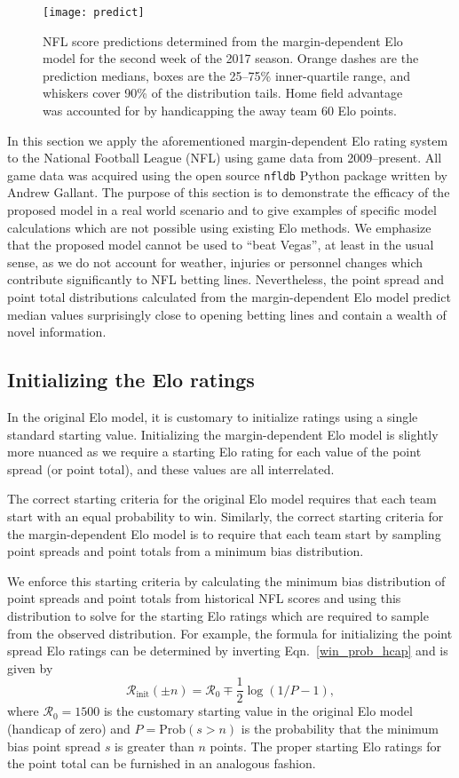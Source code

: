\documentclass[aps,prc,reprint,amsmath,superscriptaddress]{revtex4-1}
\begin{document}
\begin{figure}
  \texttt{[image: predict]}
  \caption{NFL score predictions determined from the margin-dependent Elo model for the second week of the 2017 season. Orange dashes are the prediction medians, boxes are the 25--75\% inner-quartile range, and whiskers cover 90\% of the distribution tails. Home field advantage was accounted for by handicapping the away team 60 Elo points.}
\end{figure}

In this section we apply the aforementioned margin-dependent Elo rating system to the National Football League (NFL) using game data from 2009--present.
All game data was acquired using the open source \texttt{nfldb} Python package written by Andrew Gallant.
The purpose of this section is to demonstrate the efficacy of the proposed model in a real world scenario and to give examples of specific model calculations which are not possible using existing Elo methods.
We emphasize that the proposed model cannot be used to ``beat Vegas'', at least in the usual sense, as we do not account for weather, injuries or personnel changes which contribute significantly to NFL betting lines.
Nevertheless, the point spread and point total distributions calculated from the margin-dependent Elo model predict median values surprisingly close to opening betting lines and contain a wealth of novel information.

\subsection{Initializing the Elo ratings}

In the original Elo model, it is customary to initialize ratings using a single standard starting value. 
Initializing the margin-dependent Elo model is slightly more nuanced as we require a starting Elo rating for each value of the point spread (or point total), and these values are all interrelated.

The correct starting criteria for the original Elo model requires that each team start with an equal probability to win.
Similarly, the correct starting criteria for the margin-dependent Elo model is to require that each team start by sampling point spreads and point totals from a minimum bias distribution.

We enforce this starting criteria by calculating the minimum bias distribution of point spreads and point totals from historical NFL scores and using this distribution to solve for the starting Elo ratings which are required to sample from the observed distribution.
For example, the formula for initializing the point spread Elo ratings can be determined by inverting Eqn.~\eqref{win_prob_hcap} and is given by
\begin{equation}
  \mathcal{R}_\text{init}(\pm n) = \mathcal{R}_0 \mp \frac{1}{2} \log\left(1/P - 1 \right),
\end{equation}
where $\mathcal{R}_0 = 1500$ is the customary starting value in the original Elo model (handicap of zero) and ${P=\mathrm{Prob}(s > n)}$ is the probability that the minimum bias point spread $s$ is greater than $n$ points.
The proper starting Elo ratings for the point total can be furnished in an analogous fashion.
\end{document}
